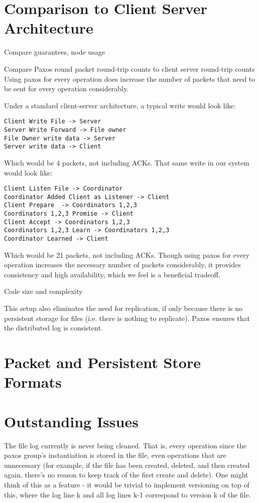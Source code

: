 \documentclass[11pt]{article}
\begin{document}
\section{Comparison to Client Server Architecture}

Compare guarantees, node usage

Compare Paxos round packet round-trip counts to client server round-trip counts
Using paxos for every operation does increase the number of packets that need to be sent for every operation considerably.

Under a standard client-server architecture, a typical write would look like:
\begin{verbatim}
Client Write File -> Server
Server Write Forward -> File owner
File Owner write data -> Server
Server write data -> Client
\end{verbatim}

Which would be 4 packets, not including ACKs. That same write in our system would look like:
\begin{verbatim}
Client Listen File -> Coordinator
Coordinator Added Client as Listener -> Client
Client Prepare  -> Coordinators 1,2,3
Coordinators 1,2,3 Promise -> Client
Client Accept -> Coordinators 1,2,3
Coordinators 1,2,3 Learn -> Coordinators 1,2,3
Coordinator Learned -> Client
\end{verbatim}
Which would be 21 packets, not including ACKs. Though using paxos for every operation increases the necessary number of packets considerably, it provides consistency and high availability, which we feel is a beneficial tradeoff.


Code size and complexity

This setup also eliminates the need for replication, if only because there is no persistent storage for files (i.e. there is nothing to replicate). Paxos ensures that the distributed log is consistent.


\section{Packet and Persistent Store Formats}

\section{Outstanding Issues}
The file log currently is never being cleaned. That is, every operation since the paxos group's instantiation is stored in the file, even operations that are unnecessary (for example, if the file has been created, deleted, and then created again, there's no reason to keep track of the first create and delete). One might think of this as a feature - it would be trivial to implement versioning on top of this, where the log line k and all log lines k-1 correspond to version k of the file. 
\end{document}
